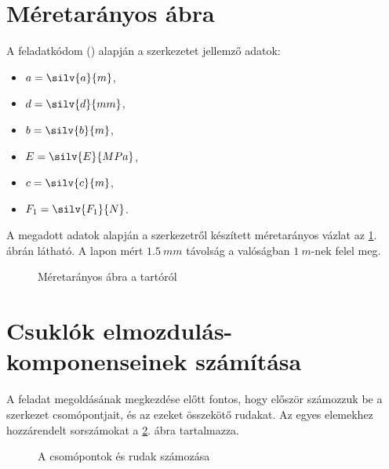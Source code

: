 \documentclass[a4paper, 12pt]{scrartcl}
\begin{document}


\section{Méretarányos ábra} %
\label{sec:Méretarányos ábra}

A feladatkódom (\texttt{})
alapján a szerkezetet jellemző adatok:
\begin{multicols}{3}
  \begin{itemize}
    \item $a = \silv{a}{m}$,
    \item $d = \silv{d}{mm}$,

    \item $b = \silv{b}{m}$,
    \item $E = \silv{E}{MPa}$,

    \item $c = \silv{c}{m}$,
    \item $F_1 = \silv{F_1}{N}$.
  \end{itemize}
\end{multicols}

A megadott adatok alapján a szerkezetről készített méretarányos vázlat az
\ref{fig:construction}. ábrán látható. A lapon mért $\SI{1.5}{mm}$ távolság
a valóságban $\SI{1}{m}$-nek felel meg.

\begin{figure}[H]
  \centering
  
  \caption{Méretarányos ábra a tartóról}
  \label{fig:construction}
\end{figure}


\section{Csuklók elmozdulás-komponenseinek számítása} %
\label{sec:Csuklók elmozdulás-komponenseinek számítása}

A feladat megoldásának megkezdése előtt fontos, hogy először számozzuk be
a szerkezet csomópontjait, és az ezeket összekötő rudakat. Az egyes elemekhez
hozzárendelt sorszámokat a \ref{fig:numbering}. ábra tartalmazza.

\begin{figure}[H]
  \centering
  
  \caption{A csomópontok és rudak számozása}
  \label{fig:numbering}
\end{figure}
\end{document}
